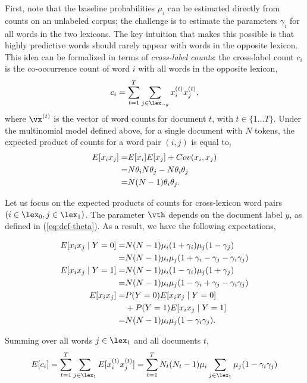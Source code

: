 First, note that the baseline probabilities $\mu_i$ can be estimated directly from counts on an unlabeled corpus; the challenge is to estimate the parameters $\gamma_i$ for all words in the two lexicons. The key intuition that makes this possible is that highly predictive words should rarely appear with words in the opposite lexicon. This idea can be formalized in terms of \emph{cross-label counts}: the cross-label count $c_i$ is the co-occurrence count of word $i$ with all words in the opposite lexicon,
\begin{equation}
c_i = \sum_{t=1}^T \sum_{j \in \lex_{\neg y}} x^{(t)}_{i} x^{(t)}_{j},
\end{equation}
where $\vx^{(t)}$ is the vector of word counts for document $t$, with $t \in \{1\ldots T\}$. Under the multinomial model defined above, for a single document with $N$ tokens, the expected product of counts for a word pair $(i,j)$ is equal to,
\begin{align}
\notag
E[x_i x_j] = & E[x_i] E[x_j] + Cov(x_i,x_j)\\
\notag
= & N\theta_i N \theta_j - N \theta_i \theta_j\\
= & N(N-1) \theta_i \theta_j.
\end{align}

Let us focus on the expected products of counts for cross-lexicon word pairs $(i \in \lex_0, j \in \lex_1)$. The parameter $\vth$ depends on the document label $y$, as defined in (\ref{eq:def-theta}). As a result, we have the following expectations,
\begin{small}
\begin{align}
\notag
E[x_i x_j \mid Y = 0] = & N(N-1) \mu_i (1 + \gamma_i) \mu_j (1 - \gamma_j) \\
= & N(N-1)\mu_i \mu_j (1 + \gamma_i - \gamma_j - \gamma_i \gamma_j)\\
\notag
E[x_i x_j \mid Y = 1] = & N(N-1) \mu_i (1 - \gamma_i) \mu_j (1 + \gamma_j) \\
= & N(N-1)\mu_i \mu_j (1 - \gamma_i + \gamma_j - \gamma_i \gamma_j)\\
\notag
E[x_i x_j] = & P(Y=0)E[x_i x_j \mid Y = 0] \\
\notag
& + P(Y=1)E[x_i x_j \mid Y = 1]\\
= & N (N-1) \mu_i \mu_j (1 -\gamma_i \gamma_j).
\end{align}
\end{small}
Summing over all words $j \in \lex_1$ and all documents $t$, 
\begin{dmath}
E[c_i] =  \sum^T_{t=1} \sum_{j\in \lex_1} E[x^{(t)}_i x^{(t)}_j]\\
 =  \sum^T_{t=1} N_t (N_t - 1) 
\mu_i \sum_{j\in \lex_1}  \mu_j (1 - \gamma_i \gamma_j) 
\label{eq:expected-co-count}
\end{dmath}

